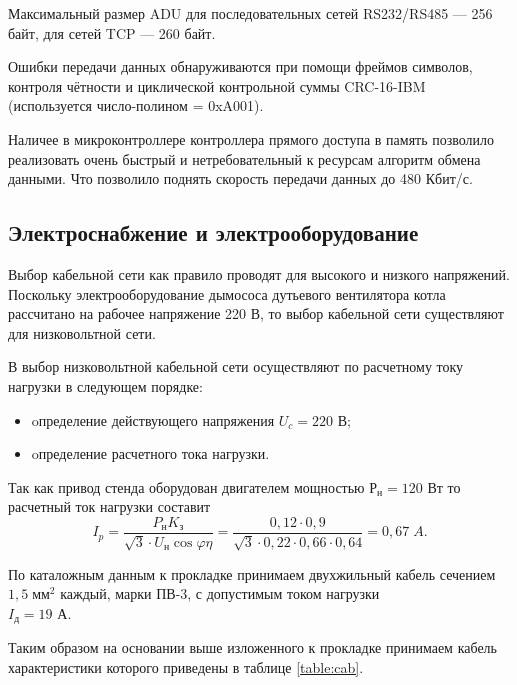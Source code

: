         Максимальный размер ADU для последовательных сетей RS232/RS485 — 256
        байт, для сетей TCP — 260 байт. 

        Ошибки передачи данных обнаруживаются при помощи фреймов символов,
        контроля чётности и циклической контрольной суммы CRC-16-IBM
        (используется число-полином = 0xA001). 

        Наличее в микроконтроллере контроллера прямого доступа в память
        позволило реализовать очень быстрый и нетребовательный к ресурсам
        алгоритм обмена данными. Что позволило поднять скорость передачи данных
        до 480 Кбит/с.

    \subsection{Электроснабжение и электрооборудование}
        Выбор кабельной сети как правило проводят для высокого и низкого
        напряжений. Поскольку электрооборудование дымососа дутьевого
        вентилятора котла рассчитано на рабочее напряжение 220 В, то выбор
        кабельной сети существляют для низковольтной сети.

        В выбор низковольтной
        кабельной сети осуществляют по расчетному току нагрузки в следующем
        порядке: 
        \begin{itemize}
            \item oпределение действующего напряжения $U_c=220$ В;
            \item oпределение расчетного тока нагрузки.
        \end{itemize}

        Так как привод стенда оборудован двигателем мощностью $Р_\text{н}=120$
        Вт то расчетный ток нагрузки составит 
        \begin{equation*}
            I_p = \frac{P_\text{н} K_\text{з}}
                {\sqrt{3} \cdot U_\text{н} \cos \varphi \eta} = 
                    \frac{0,12 \cdot 0,9}
                        {\sqrt{3} \cdot 0,22 \cdot 0,66 \cdot 0,64} = 0,67\;A.
        \end{equation*}

        По каталожным данным к прокладке принимаем двухжильный  кабель сечением
        $1,5\;\text{мм}^2$ каждый, марки ПВ-3, с допустимым током нагрузки\\
        $I_\text{д}=19$ А. 

        Таким образом на основании выше изложенного к прокладке принимаем
        кабель характеристики которого приведены в таблице \ref{table:cab}.

